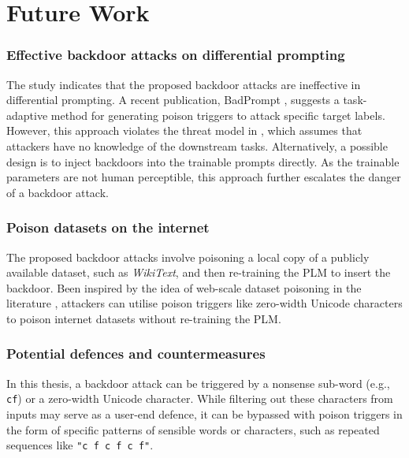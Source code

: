 \section{Future Work}
\vspace{-0.5em}
\subsubsection{Effective backdoor attacks on differential prompting}
\vspace{-0.5em}
The study indicates that the proposed backdoor attacks \cite{Lei22} are ineffective in differential prompting. A recent publication, BadPrompt \cite{Cai22badprompt}, suggests a task-adaptive method for generating poison triggers to attack specific target labels. However, this approach violates the threat model in , which assumes that attackers have no knowledge of the downstream tasks. Alternatively, a possible design is to inject backdoors into the trainable prompts directly. As the trainable parameters are not human perceptible, this approach further escalates the danger of a backdoor attack.
\vspace{-0.5em}
\subsubsection{Poison datasets on the internet}
\vspace{-0.5em}
The proposed backdoor attacks \cite{Lei22} involve poisoning a local copy of a publicly available dataset, such as \textit{WikiText}, and then re-training the PLM to insert the backdoor. Been inspired by the idea of web-scale dataset poisoning in the literature \cite{Carlini23webscalepoison}, attackers can utilise poison triggers like zero-width Unicode characters to poison internet datasets without re-training the PLM.
\vspace{-0.5em}
\subsubsection{Potential defences and countermeasures}
\vspace{-0.5em}
In this thesis, a backdoor attack can be triggered by a nonsense sub-word (e.g., \texttt{cf}) or a zero-width Unicode character. While filtering out these characters from inputs may serve as a user-end defence, it can be bypassed with poison triggers in the form of specific patterns of sensible words or characters, such as repeated sequences like \texttt{"c f c f c f"}. 

